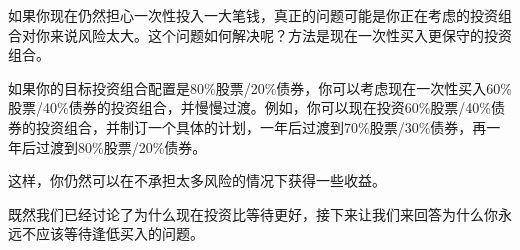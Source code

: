 如果你现在仍然担心一次性投入一大笔钱，真正的问题可能是你正在考虑的投资组合对你来说风险太大。这个问题如何解决呢？方法是现在一次性买入更保守的投资组合。

如果你的目标投资组合配置是80\%股票/20\%债券，你可以考虑现在一次性买入60\%股票/40\%债券的投资组合，并慢慢过渡。例如，你可以现在投资60\%股票/40\%债券的投资组合，并制订一个具体的计划，一年后过渡到70\%股票/30\%债券，再一年后过渡到80\%股票/20\%债券。

这样，你仍然可以在不承担太多风险的情况下获得一些收益。

既然我们已经讨论了为什么现在投资比等待更好，接下来让我们来回答为什么你永远不应该等待逢低买入的问题。

